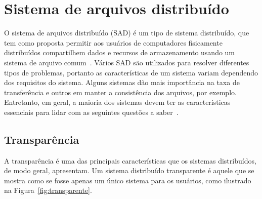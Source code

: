 	
	
	
	\section{Sistema de arquivos distribuído}
	
	O sistema de arquivos distribuído (SAD) é um tipo de sistema distribuído, que tem como proposta permitir aos usuários de computadores fisicamente distribuídos compartilhem dados e recursos de armazenamento usando um sistema de arquivo comum~\cite{levy90}. Vários SAD são utilizados para resolver diferentes tipos de problemas, portanto as características de um sistema variam dependendo dos requisitos do sistema. Alguns sistemas dão mais importância na taxa de transferência e outros em manter a consistência dos arquivos, por exemplo. Entretanto, em geral, a maioria dos sistemas devem ter as características essenciais para lidar com as seguintes questões a saber~\cite{tanenbaum07,coulouris06, galli00, kon94}.
	\\
	
	\subsection{Transparência}
	A transparência é uma das principais características que os sistemas distribuídos, de modo geral, apresentam. Um sistema distribuído transparente é aquele que se mostra como se fosse apenas um único sistema para os usuários, como ilustrado na Figura~\ref{fig:transparente}. 
	\\

